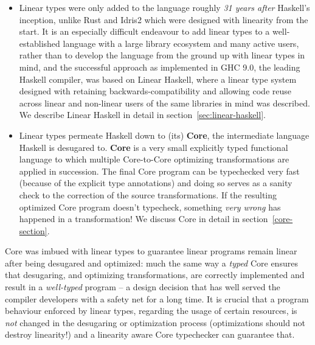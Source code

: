 \documentclass[]{lwnovathesis}
\begin{document}
\begin{itemize}
    \item Linear types were only added to the language roughly \emph{31 years
        after} Haskell's inception, unlike Rust and Idris2 which were
        designed with linearity from the start. It is an especially difficult
        endeavour to add linear types to a well-established language with a
        large library ecosystem and many active users, rather than to develop
        the language from the ground up with linear types in mind, and the
        successful approach as implemented in GHC 9.0, the leading Haskell
        compiler, was based on Linear Haskell\cite{linearhaskell}, where a
        linear type system designed with retaining backwards-compatibility and
        allowing code reuse across linear and non-linear users of the same
        libraries in mind was described. We describe Linear Haskell in detail in
        section~\ref{sec:linear-haskell}.

    \item Linear types permeate Haskell down to (its) \textbf{Core}, the
        intermediate language Haskell is desugared to. \textbf{Core} is a very
        small explicitly typed functional language to which multiple
        Core-to-Core optimizing transformations are applied in succession. The
        final Core program can be typechecked very fast (because of the explicit
        type annotations) and doing so serves as a sanity check to the
        correction of the source transformations. If the resulting optimized
        Core program doesn't typecheck, something \emph{very wrong} has happened
        in a transformation!  We discuss Core in detail in
        section~\ref{core-section}.
\end{itemize}

Core was imbued with linear types to guarantee linear programs remain linear after being
desugared and optimized: much the same way a \emph{typed} Core ensures that
desugaring, and optimizing transformations, are correctly implemented and result
in a \emph{well-typed} program -- a design decision that has well served the
compiler developers with a safety net for a long time. It is crucial that a
program behaviour enforced by linear types, regarding the usage of certain
resources, is \emph{not} changed in the desugaring or optimization process
(optimizations should not destroy linearity!) and a linearity aware Core
typechecker can guarantee that.
\end{document}

